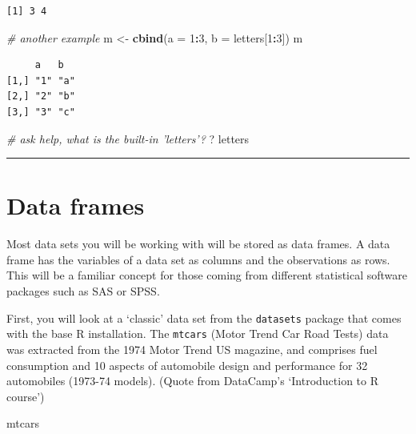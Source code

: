 \documentclass[
]{book}
\newenvironment{Shaded}{\begin{snugshade}}{\end{snugshade}}
\newcommand{\CommentTok}[1]{\textcolor[rgb]{0.56,0.35,0.01}{\textit{#1}}}
\newcommand{\DataTypeTok}[1]{\textcolor[rgb]{0.13,0.29,0.53}{#1}}
\newcommand{\DecValTok}[1]{\textcolor[rgb]{0.00,0.00,0.81}{#1}}
\newcommand{\KeywordTok}[1]{\textcolor[rgb]{0.13,0.29,0.53}{\textbf{#1}}}
\newcommand{\NormalTok}[1]{#1}
\newcommand{\OperatorTok}[1]{\textcolor[rgb]{0.81,0.36,0.00}{\textbf{#1}}}
\newcommand{\StringTok}[1]{\textcolor[rgb]{0.31,0.60,0.02}{#1}}
\begin{document}
\begin{verbatim}
[1] 3 4
\end{verbatim}

\begin{Shaded}
\begin{Highlighting}[]
\CommentTok{# another example}
\NormalTok{m <-}\StringTok{ }\KeywordTok{cbind}\NormalTok{(}\DataTypeTok{a =} \DecValTok{1}\OperatorTok{:}\DecValTok{3}\NormalTok{, }\DataTypeTok{b =}\NormalTok{ letters[}\DecValTok{1}\OperatorTok{:}\DecValTok{3}\NormalTok{])}
\NormalTok{m}
\end{Highlighting}
\end{Shaded}

\begin{verbatim}
     a   b  
[1,] "1" "a"
[2,] "2" "b"
[3,] "3" "c"
\end{verbatim}

\begin{Shaded}
\begin{Highlighting}[]
\CommentTok{# ask help, what is the built-in 'letters'?}
\NormalTok{? letters}
\end{Highlighting}
\end{Shaded}

\begin{center}\rule{0.5\linewidth}{0.5pt}\end{center}

\hypertarget{data-frames}{%
\section{Data frames}\label{data-frames}}

Most data sets you will be working with will be stored as data frames. A data frame has the variables of a data set as columns and the observations as rows. This will be a familiar concept for those coming from different statistical software packages such as SAS or SPSS.

First, you will look at a `classic' data set from the \texttt{datasets} package that comes with the base R installation. The \texttt{mtcars} (Motor Trend Car Road Tests) data was extracted from the 1974 Motor Trend US magazine, and comprises fuel consumption and 10 aspects of automobile design and performance for 32 automobiles (1973-74 models). (Quote from DataCamp's `Introduction to R course')

\begin{Shaded}
\begin{Highlighting}[]
\NormalTok{mtcars}
\end{Highlighting}
\end{Shaded}
\end{document}
